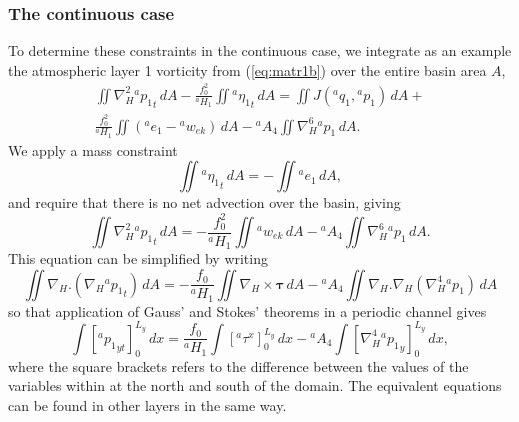 \documentclass[11pt, a4paper,twoside]{article}
\newcommand{\etb}[2]{{{}^{#1}\eta_{#2}}}
\newcommand{\q}[2]{{{}^{#1}q_{#2}}}
\newcommand{\p}[2]{{{}^{#1}p_{#2}}}
\newcommand{\ek}[1]{{{}^{#1}w_{ek}}}
\newcommand{\HH}[2]{{{}^{#1}H_{#2}}}
\newcommand{\ah}[1]{{{}^{#1}A_4}}
\newcommand{\e}[2]{{{}^{#1}e_{#2}}}
\newcommand{\tx}[2]{{}^{#1}\tau^{#2}}
\newcommand{\vc}[1]{\mathbf{#1}}
\numberwithin{equation}{section}
\begin{document}
\subsubsection{The continuous case}
To determine these constraints in the continuous case, we integrate as an example the atmospheric layer 1 vorticity from (\ref{eq:matr1b}) over the entire basin area $A$,
\begin{multline}\label{eq:vortint1}
\iint \nabla_H^2\p{a}{1}_t \, dA  - \frac{f_0^2}{\HH{a}{1}}\iint\etb{a}{1}_t \, dA = \iint J(\q{a}{1},\p{a}{1})\, dA  +\\
  \frac{f_0^2}{\HH{a}{1}}\iint (\e{a}{1} - \ek{a}) \, dA - \ah{a} \iint \nabla_H^6 \p{a}{1} \,dA.
\end{multline}
We apply a mass constraint
\begin{equation}
\iint  \etb{a}{1}_t \, dA= - \iint \e{a}{1} \, dA,
\end{equation}
and require that there is no net advection over the basin, giving
\begin{equation}
\iint \nabla_H^2\p{a}{1}_t \, dA =  - \frac{f_0^2}{\HH{a}{1}}\iint  \ek{a} \, dA - \ah{a} \iint \nabla_H^6 \p{a}{1} \, dA.
\end{equation}
This equation can be simplified by writing
\begin{equation}
\iint \nabla_H.(\nabla_H\p{a}{1}_t) \, dA =  - \frac{f_0}{\HH{a}{1}}\iint \nabla_H \times \vc{\tau} \, dA - \ah{a} \iint \nabla_H . \nabla_H(\nabla_H^4 \p{a}{1}) \, dA
\end{equation}
so that application of Gauss' and Stokes' theorems in a periodic channel gives
\begin{equation}  \label{eq:momintd}
\int \left[\p{a}{1}_{yt}\right]_0^{L_y}\, dx = \frac{f_0}{\HH{a}{1}}\int \left[\tx{a}{x}\right]_0^{L_y} \, dx  - \ah{a} \int \left[\nabla_H^4 \p{a}{1}_y\right]_0^{L_y}\, dx,
\end{equation}
where the square brackets refers to the difference between the values of the variables within at the north and south of the domain.
The equivalent equations can be found in other layers in the same way.
\end{document}
